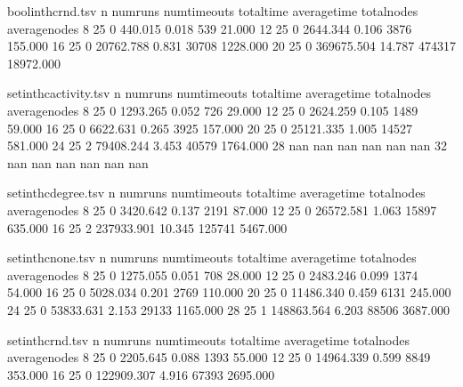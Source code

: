 \begin{filecontents}{boolinthcrnd.tsv}
	n	numruns	numtimeouts	totaltime	averagetime	totalnodes	averagenodes
	8	25	0	440.015	0.018	539	21.000
	12	25	0	2644.344	0.106	3876	155.000
	16	25	0	20762.788	0.831	30708	1228.000
	20	25	0	369675.504	14.787	474317	18972.000
\end{filecontents}

\begin{filecontents}{setinthcactivity.tsv}
	n	numruns	numtimeouts	totaltime	averagetime	totalnodes	averagenodes
	8	25	0	1293.265	0.052	726	29.000
	12	25	0	2624.259	0.105	1489	59.000
	16	25	0	6622.631	0.265	3925	157.000
	20	25	0	25121.335	1.005	14527	581.000
	24	25	2	79408.244	3.453	40579	1764.000
	28	nan	nan	nan	nan	nan	nan
	32	nan	nan	nan	nan	nan	nan
\end{filecontents}

\begin{filecontents}{setinthcdegree.tsv}
	n	numruns	numtimeouts	totaltime	averagetime	totalnodes	averagenodes
	8	25	0	3420.642	0.137	2191	87.000
	12	25	0	26572.581	1.063	15897	635.000
	16	25	2	237933.901	10.345	125741	5467.000
\end{filecontents}

\begin{filecontents}{setinthcnone.tsv}
	n	numruns	numtimeouts	totaltime	averagetime	totalnodes	averagenodes
	8	25	0	1275.055	0.051	708	28.000
	12	25	0	2483.246	0.099	1374	54.000
	16	25	0	5028.034	0.201	2769	110.000
	20	25	0	11486.340	0.459	6131	245.000
	24	25	0	53833.631	2.153	29133	1165.000
	28	25	1	148863.564	6.203	88506	3687.000
\end{filecontents}

\begin{filecontents}{setinthcrnd.tsv}
	n	numruns	numtimeouts	totaltime	averagetime	totalnodes	averagenodes
	8	25	0	2205.645	0.088	1393	55.000
	12	25	0	14964.339	0.599	8849	353.000
	16	25	0	122909.307	4.916	67393	2695.000
\end{filecontents}
